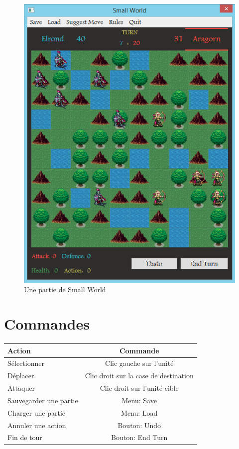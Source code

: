 \documentclass[a4paper]{article}
\begin{document}
\begin{figure}[h]
\begin{center}
\includegraphics[scale=0.5]{./img/game_window.png}
\caption{Une partie de Small World}
\end{center}
\end{figure}

\section{Commandes}
\paragraph{}

\begin{tabular}{|l|c|}
  \hline
  Action & Commande \\
  \hline
  Sélectionner & Clic gauche sur l'unité \\
  Déplacer & Clic droit sur la case de destination \\
  Attaquer & Clic droit sur l'unité cible \\
  Sauvegarder une partie & Menu: Save \\
  Charger une partie & Menu: Load \\
  Annuler une action & Bouton: Undo \\
  Fin de tour & Bouton: End Turn \\
  \hline
\end{tabular}
\newpage
\end{document}
